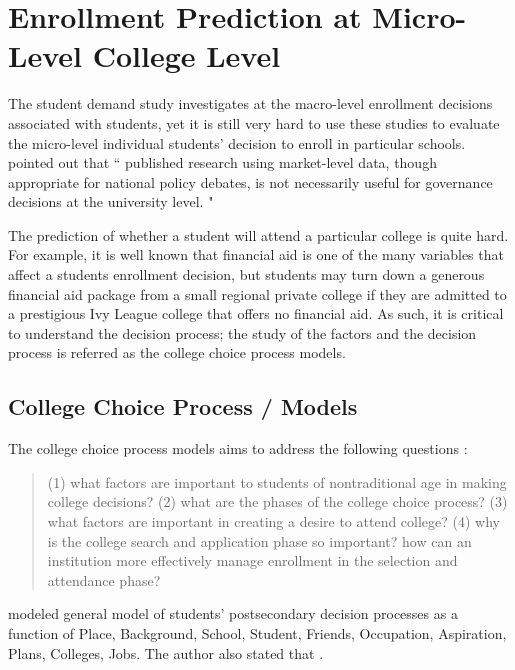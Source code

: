 \documentclass[12pt,english]{report}
\begin{document}
\section{Enrollment Prediction at Micro-Level College Level}
The student demand study investigates at the macro-level enrollment decisions
associated with students, yet it is still very hard to use these studies to
evaluate the micro-level individual students' decision to enroll in
particular schools. \citet{Carter2011} pointed out that `` published research
using market-level data, though appropriate for national policy debates, is not
necessarily useful for governance decisions at the university level. "

The prediction of whether a student will attend a particular college is quite
hard.  For example,  it is well known that financial aid is one of the many
variables that affect a students enrollment decision, but students may turn
down a generous financial aid package from a small regional private college if
they are admitted to a prestigious Ivy League college that offers no financial
aid.  As such, it is critical to understand the decision process; the study of
the factors and the decision process is referred as the college choice
process
models.

\subsection{College Choice Process / Models} 
The college choice process models aims to address the following questions
\citep{Paulsen1990}:
\begin{quote}
 (1) what factors are important to students of nontraditional age in making
college decisions? (2) what are the phases of the college choice process?
(3) what factors are important in creating a desire to attend college? (4)
why is the college search and application phase so important? how
can an institution more effectively manage enrollment in the selection and
attendance phase?
\end{quote}

\citet{Jackson1978}  modeled general model of students' postsecondary decision
processes as a function of Place, Background, School, Student, Friends,
Occupation, Aspiration, Plans, Colleges, Jobs.  The author also stated that
.
\end{document}
